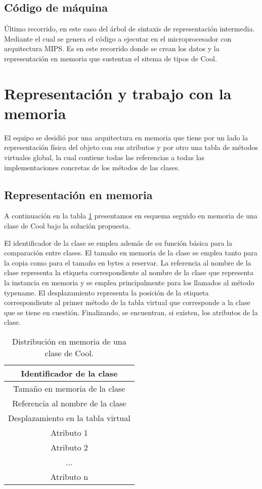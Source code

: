\documentclass[a4paper,10pt,twocolumn]{article}
\begin{document}
	\subsection{Código de máquina}
	\'Ultimo recorrido, en este caso del árbol de sintaxis de representación intermedia. Mediante el cual se genera el código a ejecutar en el microprocesador con arquitectura MIPS. Es en este recorrido donde se crean los datos y la representación en memoria que sustentan el sitema de tipos de Cool.
	
	
\section{Representación y trabajo con la memoria}

El equipo se desidió por una arquitectura en memoria que tiene por un lado la representación física del objeto con sus atributos y por otro una tabla de métodos virtuales global, la cual contiene todas las referencias a todas las implementaciones concretas de los métodos de las clases.

\subsection{Representación en memoria}

A continuación en la tabla \ref{fig:memory} presentamos en esquema seguido en memoria de una clase de Cool bajo la solución propuesta.

El identificador de la clase se emplea además de su función básica para la comparación entre clases. El tamaño en memoria de la clase se emplea tanto para la copia como para el tamaño en bytes a reservar. La referencia al nombre de la clase representa la etiqueta correspondiente al nombre de la clase que representa la instancia en memoria y se emplea principalmente para los llamados al método typename. El desplazamiento representa la posición de la etiqueta correspondiente al primer método de la tabla virtual que corresponde a la clase que se tiene en cuestión. Finalizando, se encuentran, si existen, los atributos de la clase.

\begin{table}[h]
	\centering
	\begin{tabular}{|c|}
		\hline
		Identificador de la clase \\
		\hline
		Tamaño en memoria de la clase  \\
		\hline
		Referencia al nombre de la clase \\
		\hline
		Desplazamiento en la tabla virtual  \\
		\hline
		Atributo 1 \\
		\hline
		Atributo 2  \\
		\hline
		...  \\
		\hline
		Atributo n \\
		\hline
	\end{tabular}
	\caption{Distribución en memoria de una clase de Cool.}
	\label{fig:memory}
	
\end{table}
\end{document}
